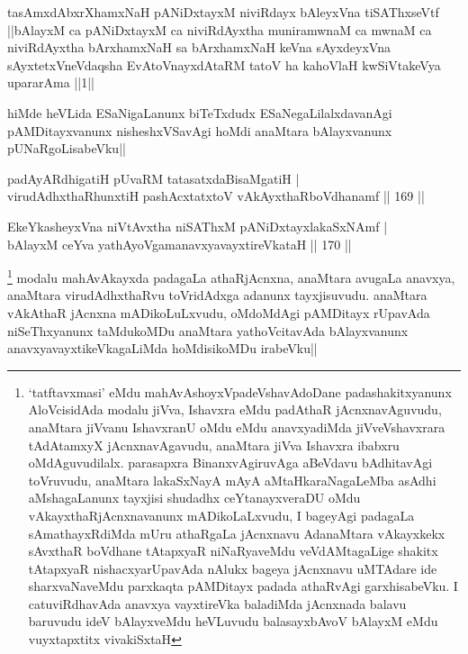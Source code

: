 \begin{shl}
tasAmxdAbxrXhamxNaH pANiDxtayxM niviRdayx bAleyxVna tiSAThxseVtf ||bAlayxM ca pANiDxtayxM ca niviRdAyxtha muniramwnaM ca mwnaM ca niviRdAyxtha bArxhamxNaH sa bArxhamxNaH keVna sAyxdeyxVna sAyxtetxVneVdaqsha EvAtoV\s nayxdAtaRM tatoV ha kahoVlaH kwSiVtakeVya upararAma ||1||
\end{shl}

\begin{artha}
hiMde heVLida ESaNigaLanunx biTeTxdudx ESaNegaLilalxdavanAgi pAMDitayxvanunx nisheshxVSavAgi hoMdi anaMtara bAlayxvanunx pUNaRgoLisabeVku||
\end{artha}


\begin{shl}
padAyARdhigatiH pUvaRM tatasatxdaBisaMgatiH |\\
virudAdhxthaRhunxtiH pashAcxtatxtoV vAkAyxthaRboVdhanamf \hfill || 169 ||
\end{shl}

\begin{shl}
EkeYkasheyxVna niVtAvx\s tha niSAThxM pANiDxtayxlakaSxNAmf |\\
bAlayxM ceYva yathAyoVgamanavxyavayxtireVkataH \hfill || 170 ||
\end{shl}

\begin{artha}
\footnote[1]{`tatftavxmasi' eMdu mahAvAshoyxVpadeVshavAdoDane padashakitxyanunx AloVcisidAda modalu jiVva, Ishavxra eMdu padAthaR jAcnxnavAguvudu, anaMtara jiVvanu IshavxranU oMdu eMdu anavxyadiMda jiVveVshavxrara tAdAtamxyX jAcnxnavAgavudu, anaMtara jiVva Ishavxra ibabxru oMdAguvudilalx. parasapxra BinanxvAgiruvAga aBeVdavu bAdhitavAgi toVruvudu, anaMtara lakaSxNayA mAyA aMtaHkaraNagaLeMba asAdhi aMshagaLanunx tayxjisi shudadhx ceYtanayxveraDU oMdu vAkayxthaRjAcnxnavanunx mADikoLaLxvudu, I bageyAgi padagaLa sAmathayxRdiMda mUru athaRgaLa jAcnxnavu AdanaMtara vAkayxkekx sAvxthaR boVdhane tAtapxyaR niNaRyaveMdu veVdAMtagaLige shakitx tAtapxyaR nishacxyarUpavAda nAlukx bageya jAcnxnavu uMTAdare ide sharxvaNaveMdu parxkaqta pAMDitayx padada athaRvAgi garxhisabeVku. I catuviRdhavAda anavxya vayxtireVka baladiMda jAcnxnada balavu baruvudu ideV bAlayxveMdu heVLuvudu balasayxbAvoV bAlayxM eMdu vuyxtapxtitx vivakiSxtaH} modalu mahAvAkayxda padagaLa athaRjAcnxna, anaMtara avugaLa anavxya, anaMtara virudAdhxthaRvu toVridAdxga adanunx tayxjisuvudu. anaMtara vAkAthaR jAcnxna mADikoLuLxvudu, oMdoMdAgi pAMDitayx rUpavAda niSeThxyanunx taMdukoMDu anaMtara yathoVcitavAda bAlayxvanunx anavxyavayxtikeVkagaLiMda hoMdisikoMDu irabeVku||
\end{artha}

